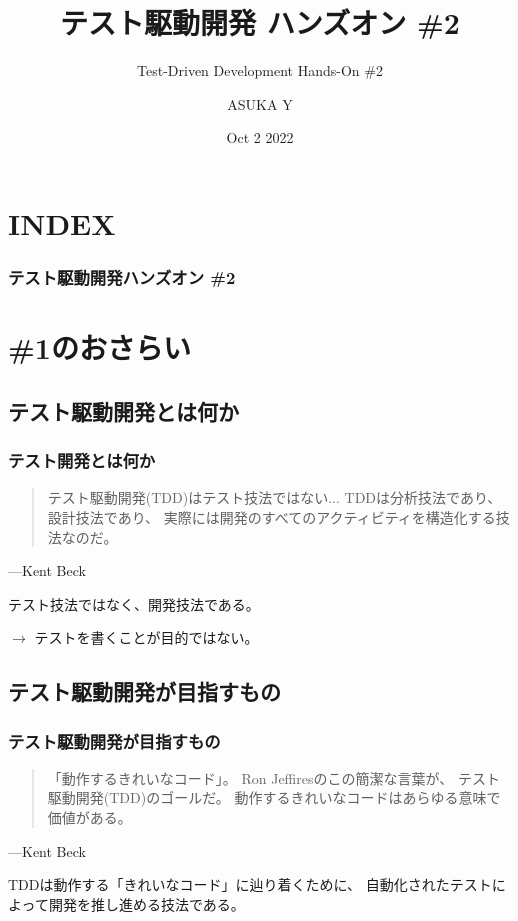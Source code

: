 \documentclass[aspectratio=169]{beamer}
\title{テスト駆動開発 ハンズオン \#2}
\subtitle{Test-Driven Development Hands-On \#2}
\author{ASUKA Y}
\date{Oct 2 2022}
\begin{document}
\begin{frame}
  \titlepage
\end{frame}

\section*{INDEX}
\begin{frame}
  \frametitle{テスト駆動開発ハンズオン \#2}
  \tableofcontents
\end{frame}

\section{\#1のおさらい}
\subsection{テスト駆動開発とは何か}
\begin{frame}\frametitle{テスト開発とは何か}
  \begin{quote}
    テスト駆動開発(TDD)はテスト技法ではない...
    TDDは分析技法であり、設計技法であり、
    実際には開発のすべてのアクティビティを構造化する技法なのだ。
  \end{quote}
  \begin{flushright}
    ---Kent Beck
  \end{flushright}

  テスト技法ではなく、開発技法である。

  {
    \large \color{blue}
    $\rightarrow$
    テストを書くことが目的ではない。
  }
\end{frame}

\subsection{テスト駆動開発が目指すもの}
\begin{frame}\frametitle{テスト駆動開発が目指すもの}
  \begin{quote}
    「動作するきれいなコード」。
    Ron Jeffiresのこの簡潔な言葉が、
    テスト駆動開発(TDD)のゴールだ。
    動作するきれいなコードはあらゆる意味で価値がある。
  \end{quote}
  \begin{flushright}
    ---Kent Beck
  \end{flushright}

  TDDは動作する「きれいなコード」に辿り着くために、
  {\color{blue} 自動化されたテストによって開発を推し進める技法}である。
\end{frame}
\end{document}
